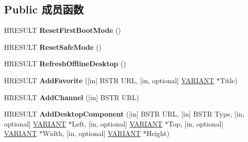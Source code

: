 \subsection*{Public 成员函数}
\begin{DoxyCompactItemize}
\item 
\mbox{\label{interface_s_h_doc_vw_1_1_i_shell_u_i_helper_aeeb7a38b39dd2af612f15455de93a347}} 
H\+R\+E\+S\+U\+LT {\bfseries Reset\+First\+Boot\+Mode} ()
\item 
\mbox{\label{interface_s_h_doc_vw_1_1_i_shell_u_i_helper_aea22824910bb2df2ca92157478dc7245}} 
H\+R\+E\+S\+U\+LT {\bfseries Reset\+Safe\+Mode} ()
\item 
\mbox{\label{interface_s_h_doc_vw_1_1_i_shell_u_i_helper_a611c2b7c44033e05d4933107daa0938f}} 
H\+R\+E\+S\+U\+LT {\bfseries Refresh\+Offline\+Desktop} ()
\item 
\mbox{\label{interface_s_h_doc_vw_1_1_i_shell_u_i_helper_aab1e260f19f4f4fca7d583cc2dd19b80}} 
H\+R\+E\+S\+U\+LT {\bfseries Add\+Favorite} (\mbox{[}in\mbox{]} B\+S\+TR U\+RL, \mbox{[}in, optional\mbox{]} \hyperlink{structtag_v_a_r_i_a_n_t}{V\+A\+R\+I\+A\+NT} $\ast$Title)
\item 
\mbox{\label{interface_s_h_doc_vw_1_1_i_shell_u_i_helper_a82e85edd520a679e15a1d77470e4c11d}} 
H\+R\+E\+S\+U\+LT {\bfseries Add\+Channel} (\mbox{[}in\mbox{]} B\+S\+TR U\+RL)
\item 
\mbox{\label{interface_s_h_doc_vw_1_1_i_shell_u_i_helper_a2f5609a7bc726dbc68681fed93e7b530}} 
H\+R\+E\+S\+U\+LT {\bfseries Add\+Desktop\+Component} (\mbox{[}in\mbox{]} B\+S\+TR U\+RL, \mbox{[}in\mbox{]} B\+S\+TR Type, \mbox{[}in, optional\mbox{]} \hyperlink{structtag_v_a_r_i_a_n_t}{V\+A\+R\+I\+A\+NT} $\ast$Left, \mbox{[}in, optional\mbox{]} \hyperlink{structtag_v_a_r_i_a_n_t}{V\+A\+R\+I\+A\+NT} $\ast$Top, \mbox{[}in, optional\mbox{]} \hyperlink{structtag_v_a_r_i_a_n_t}{V\+A\+R\+I\+A\+NT} $\ast$Width, \mbox{[}in, optional\mbox{]} \hyperlink{structtag_v_a_r_i_a_n_t}{V\+A\+R\+I\+A\+NT} $\ast$Height)
\item 

\end{DoxyCompactItemize}
